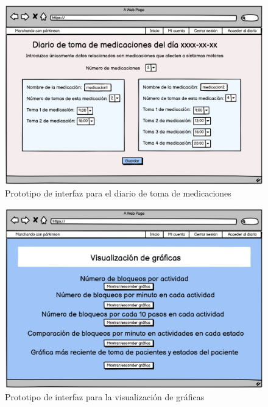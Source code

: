 \begin{figure}[h]
    \centering
    \includegraphics[width=1\textwidth]{img/wdiariotomas.png}
    \caption{Prototipo de interfaz para el diario de toma de medicaciones}
    \label{fig:Wireframemed}
\end{figure}

\begin{figure}[h]
    \centering
    \includegraphics[width=1\textwidth]{img/wgraficas.png}
    \caption{Prototipo de interfaz para la visualización de gráficas}
    \label{fig:Wireframegraficas}
\end{figure}
